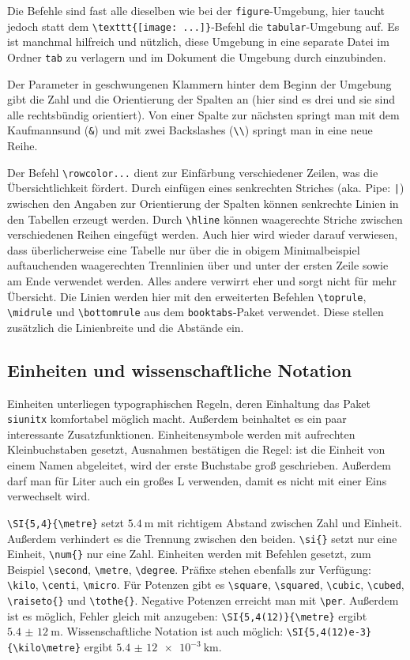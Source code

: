 Die Befehle sind fast alle dieselben wie bei der \verb|figure|-Umgebung, hier taucht jedoch statt dem \verb|\texttt{[image: ...]}|-Befehl die \verb|tabular|-Umgebung auf. Es ist manchmal hilfreich und nützlich, diese Umgebung in eine separate Datei im Ordner \verb|tab| zu verlagern und im Dokument die Umgebung durch \verb|| einzubinden.

Der Parameter in geschwungenen Klammern hinter dem Beginn der Umgebung gibt die Zahl und die Orientierung der Spalten an (hier sind es drei und sie sind alle rechtsbündig orientiert). Von einer Spalte zur nächsten springt man mit dem Kaufmannsund (\verb|&|) und mit zwei Backslashes (\verb|\\|) springt man in eine neue Reihe.

Der Befehl \verb|\rowcolor...| dient zur Einfärbung verschiedener Zeilen, was die Übersichtlichkeit fördert. Durch einfügen eines senkrechten Striches (aka. Pipe: \verb&|&) zwischen den Angaben zur Orientierung der Spalten können senkrechte Linien in den Tabellen erzeugt werden. Durch \verb|\hline| können waagerechte Striche zwischen verschiedenen Reihen eingefügt werden. Auch hier wird wieder darauf verwiesen, dass überlicherweise eine Tabelle nur über die in obigem Minimalbeispiel auftauchenden waagerechten Trennlinien über und unter der ersten Zeile sowie am Ende verwendet werden.  Alles andere verwirrt eher und sorgt nicht für mehr Übersicht. Die Linien werden hier mit den erweiterten Befehlen \verb|\toprule|, \verb|\midrule| und \verb|\bottomrule| aus dem \verb|booktabs|-Paket verwendet. Diese stellen zusätzlich die Linienbreite und die Abstände ein.

\subsection{Einheiten und wissenschaftliche Notation}
Einheiten unterliegen typographischen Regeln, deren Einhaltung das Paket \verb|siunitx| komfortabel möglich macht. Außerdem beinhaltet es ein paar interessante Zusatzfunktionen. Einheitensymbole werden mit aufrechten Kleinbuchstaben gesetzt, Ausnahmen bestätigen die Regel: ist die Einheit von einem Namen abgeleitet, wird der erste Buchstabe groß geschrieben. Außerdem darf man für Liter auch ein großes L verwenden, damit es nicht mit einer Eins verwechselt wird.

\verb|\SI{5,4}{\metre}| setzt $\SI{5,4}{\metre}$ mit richtigem Abstand zwischen Zahl und Einheit. Außerdem verhindert es die Trennung zwischen den beiden. \verb|\si{}| setzt nur eine Einheit, \verb|\num{}| nur eine Zahl. Einheiten werden mit Befehlen gesetzt, zum Beispiel \verb|\second|, \verb|\metre|, \verb|\degree|. Präfixe stehen ebenfalls zur Verfügung: \verb|\kilo|, \verb|\centi|, \verb|\micro|. Für Potenzen gibt es \verb|\square|, \verb|\squared|, \verb|\cubic|, \verb|\cubed|, \verb|\raiseto{}| und \verb|\tothe{}|. Negative Potenzen erreicht man mit \verb|\per|. Außerdem ist es möglich, Fehler gleich mit anzugeben: \verb|\SI{5,4(12)}{\metre}| ergibt $\SI{5,4(12)}{\metre}$. Wissenschaftliche Notation ist auch möglich: \verb|\SI{5,4(12)e-3}{\kilo\metre}| ergibt $\SI{5,4(12)e-3}{\kilo\metre}$.

